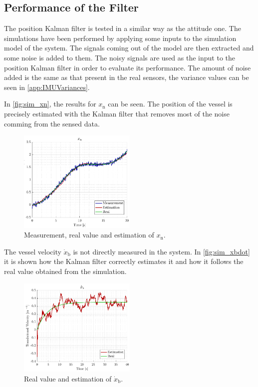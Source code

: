 \subsection{Performance of the Filter}
The position Kalman filter is tested in a similar way as the attitude one. The simulations have been performed by applying some inputs to the simulation model of the system. The signals coming out of the model are then extracted and some noise is added to them. The noisy signals are used as the input to the position Kalman filter in order to evaluate its performance. The amount of noise added is the same as that present in the real sensors, the variance values can be seen in \autoref{app:IMUVariances}. 

In \autoref{fig:sim_xn}, the results for $x_\mathrm{n}$ can be seen. The position of the vessel is precisely estimated with the Kalman filter that removes most of the noise comming from the sensed data.

\begin{figure}[H]
    \includegraphics[width=0.5\textwidth]{figures/sim_xn}
    \caption{Measurement, real value and estimation of $x_\mathrm{n}$.}
    \label{fig:sim_xn}
\end{figure}


The vessel velocity $\dot{x}_\mathrm{b}$ is not directly measured in the system. In \autoref{fig:sim_xbdot} it is shown how the Kalman filter correctly estimates it and how it follows the real value obtained from the simulation.
\begin{figure}[H]
    \includegraphics[width=0.5\textwidth]{figures/sim_xbdot}
    \caption{Real value and estimation of $\dot{x}_\mathrm{b}$.}
    \label{fig:sim_xbdot}
\end{figure}

